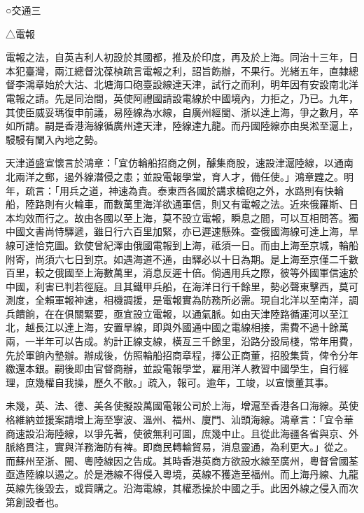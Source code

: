 
\begin{pinyinscope}
○交通三

△電報

電報之法，自英吉利人初設於其國都，推及於印度，再及於上海。同治十三年，日本犯臺灣，兩江總督沈葆楨疏言電報之利，詔旨飭辦，不果行。光緒五年，直隸總督李鴻章始於大沽、北塘海口砲臺設線達天津，試行之而利，明年因有安設南北洋電報之請。先是同治間，英使阿禮國請設電線於中國境內，力拒之，乃已。九年，其使臣威妥瑪復申前議，易陸線為水線，自廣州經閩、浙以達上海，爭之數月，卒如所請。嗣是香港海線循廣州達天津，陸線達九龍。而丹國陸線亦由吳淞至滬上，駸駸有闌入內地之勢。

天津道盛宣懷言於鴻章：「宜仿輪船招商之例，醵集商股，速設津滬陸線，以通南北兩洋之郵，遏外線潛侵之患；並設電報學堂，育人才，備任使。」鴻章韙之。明年，疏言：「用兵之道，神速為貴。泰東西各國於講求槍砲之外，水路則有快輪船，陸路則有火輪車，而數萬里海洋欲通軍信，則又有電報之法。近來俄羅斯、日本均效而行之。故由各國以至上海，莫不設立電報，瞬息之間，可以互相問答。獨中國文書尚恃驛遞，雖日行六百里加緊，亦已遲速懸殊。查俄國海線可達上海，旱線可達恰克圖。欽使曾紀澤由俄國電報到上海，祗須一日。而由上海至京城，輪船附寄，尚須六七日到京。如遇海道不通，由驛必以十日為期。是上海至京僅二千數百里，較之俄國至上海數萬里，消息反遲十倍。倘遇用兵之際，彼等外國軍信速於中國，利害已判若徑庭。且其鐵甲兵船，在海洋日行千餘里，勢必聲東擊西，莫可測度，全賴軍報神速，相機調援，是電報實為防務所必需。現自北洋以至南洋，調兵饋餉，在在俱關緊要，亟宜設立電報，以通氣脈。如由天津陸路循運河以至江北，越長江以達上海，安置旱線，即與外國通中國之電線相接，需費不過十餘萬兩，一半年可以告成。約計正線支線，橫亙三千餘里，沿路分設局棧，常年用費，先於軍餉內墊辦。辦成後，仿照輪船招商章程，擇公正商董，招股集貲，俾令分年繳還本銀。嗣後即由官督商辦，並設電報學堂，雇用洋人教習中國學生，自行經理，庶幾權自我操，歷久不敝。」疏入，報可。逾年，工竣，以宣懷董其事。

未幾，英、法、德、美各使擬設萬國電報公司於上海，增滬至香港各口海線。英使格維納並援案請增上海至寧波、溫州、福州、廈門、汕頭海線。鴻章言：「宜令華商速設沿海陸線，以爭先著，使彼無利可圖，庶幾中止。且從此海疆各省與京、外脈絡貫注，實與洋務海防有裨。即商民轉輸貿易，消息靈通，為利更大。」從之。而蘇州至浙、閩、粵陸線因之告成。其時香港英商方欲設水線至廣州，粵督曾國荃亟造陸線以遏之。於是港線不得侵入粵境，英線不獲造至福州。而上海丹線、九龍英線先後毀去，或貲購之。沿海電線，其權悉操於中國之手。此因外線之侵入而次第創設者也。


\end{pinyinscope}
